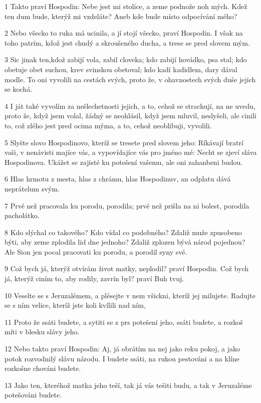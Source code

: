 \par 1 Takto praví Hospodin: Nebe jest mi stolice, a zeme podnože noh mých. Kdež ten dum bude, kterýž mi vzdeláte? Aneb kde bude místo odpocívání mého?
\par 2 Nebo všecko to ruka má ucinila, a jí stojí všecko, praví Hospodin. I však na toho patrím, kdož jest chudý a skroušeného ducha, a trese se pred slovem mým.
\par 3 Sic jinak ten,kdož zabijí vola, zabil cloveka; kdo zabijí hovádko, psa stal; kdo obetuje obet suchou, krev svinskou obetoval; kdo kadí kadidlem, dary dával modle. To oni vyvolili na cestách svých, proto že, v ohavnostech svých duše jejich se kochá.
\par 4 I ját také vyvolím za nešlechetnosti jejich, a to, cehož se strachují, na ne uvedu, proto že, když jsem volal, žádný se neohlásil, když jsem mluvil, neslyšeli, ale cinili to, což zlého jest pred ocima mýma, a to, cehož neoblibuji, vyvolili.
\par 5 Slyšte slovo Hospodinovo, kteríž se tresete pred slovem jeho: Ríkávají bratrí vaši, v nenávisti majíce vás, a vypovídajíce vás pro jméno mé: Necht se zjeví sláva Hospodinova. Ukážet se zajisté ku potešení vašemu, ale oni zahanbeni budou.
\par 6 Hlas hrmotu z mesta, hlas z chrámu, hlas Hospodinuv, an odplatu dává neprátelum svým.
\par 7 Prvé než pracovala ku porodu, porodila; prvé než prišla na ni bolest, porodila pacholátko.
\par 8 Kdo slýchal co takového? Kdo vídal co podobného? Zdaliž muže zpusobeno býti, aby zeme zplodila lid dne jednoho? Zdaliž zplozen bývá národ pojednou? Ale Sion jen pocal pracovati ku porodu, a porodil syny své.
\par 9 Což bych já, kterýž otvírám život matky, neplodil? praví Hospodin. Což bych já, kterýž ciním to, aby rodily, zavrín byl? praví Buh tvuj.
\par 10 Veselte se s Jeruzalémem, a plésejte v nem všickni, kteríž jej milujete. Radujte se s ním velice, kteríž jste koli kvílili nad ním,
\par 11 Proto že ssáti budete, a sytiti se z prs potešení jeho, ssáti budete, a rozkoš míti v blesku slávy jeho.
\par 12 Nebo takto praví Hospodin: Aj, já obrátím na nej jako reku pokoj, a jako potok rozvodnilý slávu národu. I budete ssáti, na rukou pestováni a na klíne rozkošne chováni budete.
\par 13 Jako ten, kteréhož matka jeho teší, tak já vás tešiti budu, a tak v Jeruzaléme potešováni budete.
